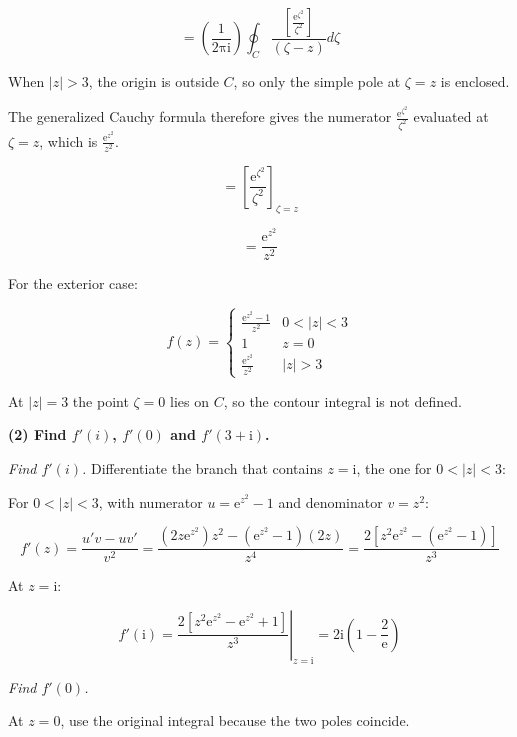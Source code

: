 \documentclass[11pt,a4paper]{article}
\theoremstyle{definition}
\theoremstyle{plain}
\begin{document}
\[
= \left(\frac{1}{2\mathrm{\pi}\mathrm{i}}\right)\oint_{C}\frac{[\frac{\mathrm{e}^{\zeta^{2}}}{\zeta^{2}}]}{(\zeta - z)}d\zeta
\]

When $\vert{}z\vert{} > 3$, the origin is outside $C$, so only the simple pole at $\zeta = z$ is enclosed.

The generalized Cauchy formula therefore gives the numerator $\frac{\mathrm{e}^{\zeta^{2}}}{\zeta^{2}}$ evaluated at $\zeta = z$, which is $\frac{\mathrm{e}^{z^{2}}}{z^{2}}$.

\[
= {[\frac{\mathrm{e}^{\zeta^{2}}}{\zeta^{2}}]}_{\zeta = z}
\]

\[
= \frac{\mathrm{e}^{z^{2}}}{z^{2}}
\]

For the exterior case:

\begin{equation}
f(z) = \begin{cases} \frac{\mathrm{e}^{z^{2}} - 1}{z^{2}} & 0 < \vert{}z\vert{} < 3 \\ 1 & z = 0 \\ \frac{\mathrm{e}^{z^{2}}}{z^{2}} & \vert{}z\vert{} > 3 \end{cases}
\end{equation}

At $\vert{}z\vert{} = 3$ the point $\zeta = 0$ lies on $C$, so the contour integral is not defined.

\textbf{(2) Find $f'(i)$, $f'(0)$ and $f'(3 + \mathrm{i})$.}

\textit{Find $f'(i)$.} Differentiate the branch that contains $z = \mathrm{i}$, the one for $0 < \vert{}z\vert{} < 3$:

For $0 < \vert{}z\vert{} < 3$, with numerator $u = \mathrm{e}^{z^{2}} - 1$ and denominator $v = z^{2}$:



$$ f'(z) = \frac{u'v - uv'}{v^{2}} = \frac{(2z\mathrm{e}^{z^{2}})z^{2} - (\mathrm{e}^{z^{2}} - 1)(2z)}{z^{4}} = \frac{2[z^{2}\mathrm{e}^{z^{2}} - (\mathrm{e}^{z^{2}} - 1)]}{z^{3}} $$

At $z = \mathrm{i}$:

\begin{equation}
f'(\mathrm{i}) = {\left.\frac{2[z^{2}\mathrm{e}^{z^{2}} - \mathrm{e}^{z^{2}} + 1]}{z^{3}}\right\vert{}}_{z = \mathrm{i}} = 2\mathrm{i}\left(1 - \frac{2}{\mathrm{e}}\right)
\end{equation}

\textit{Find $f'(0)$.}

At $z = 0$, use the original integral because the two poles coincide.
\end{document}
